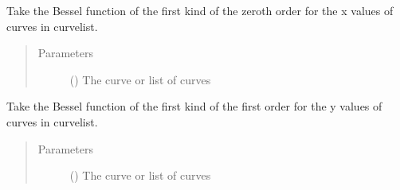 \documentclass[letterpaper,10pt,english]{sphinxmanual}
\begin{document}

\begin{fulllineitems}
\label{\detokenize{pydv:pydvpy.j0x}}
Take the Bessel function of the first kind of the zeroth order for the x values of
curves in curvelist.
\begin{quote}\begin{description}
\item[{Parameters}] \leavevmode
{} () \textendash{} The curve or list of curves

\end{description}\end{quote}

\end{fulllineitems}


\begin{fulllineitems}
\label{\detokenize{pydv:pydvpy.j1}}
Take the Bessel function of the first kind of the first order for the y values of
curves in curvelist.
\begin{quote}\begin{description}
\item[{Parameters}] \leavevmode
{} () \textendash{} The curve or list of curves

\end{description}\end{quote}

\end{fulllineitems}

\end{document}
